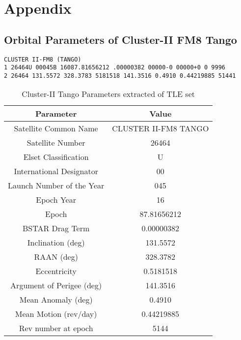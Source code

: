 \section*{Appendix}

\subsection*{Orbital Parameters of Cluster-II FM8 Tango}
\label{tleParameters}
\texttt{CLUSTER II-FM8 (TANGO)\\
1 26464U 00045B 16087.81656212 .00000382 00000-0 00000+0 0 9996\\
2 26464 131.5572 328.3783 5181518 141.3516 0.4910 0.44219885 51441}

\vspace{1em}

\begin{table}[h!]
\centering
\caption{Cluster-II Tango Parameters extracted of TLE set}
\label{table:tle}
\begin{tabular}{|c | c|} 
 \hline
 \textbf{Parameter} & \textbf{Value} \\ [0.5ex] 
 \hline
 Satellite Common Name &  CLUSTER II-FM8 TANGO\\ 
 Satellite Number &  26464\\
 Elset Classification &  U\\
 International Designator &  00\\
 Launch Number of the Year & 045\\
 Epoch Year & 16\\
 Epoch & 87.81656212\\
 BSTAR Drag Term &  0.00000382\\
 Inclination (deg) &  131.5572\\
 RAAN (deg) &  328.3782\\
 Eccentricity &  0.5181518\\
 Argument of Perigee (deg) &  141.3516\\
 Mean Anomaly (deg) &  0.4910\\
 Mean Motion (rev/day) &  0.44219885\\
 Rev number at epoch &  5144 \\ [1ex] 
 \hline
\end{tabular}
\end{table}
